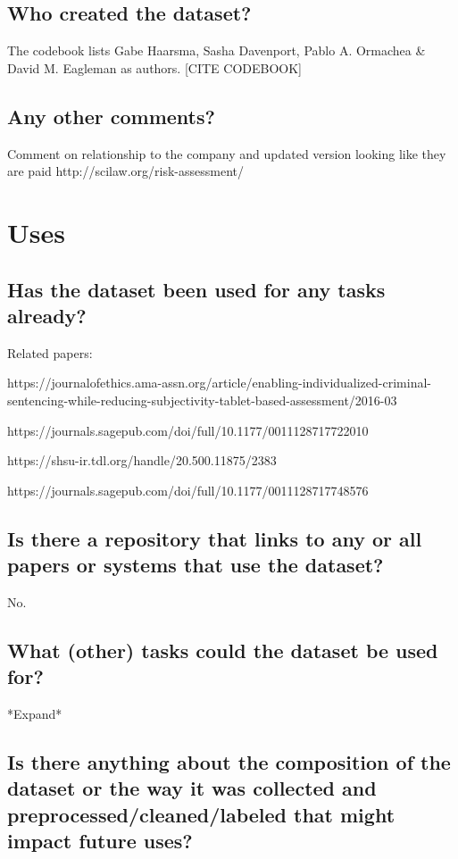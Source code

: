 \documentclass[letterpaper, 10 pt, conference]{ieeeconf}  %
\begin{document}
\subsection{Who created the dataset?}

The codebook lists Gabe Haarsma, Sasha Davenport, Pablo A. Ormachea & David M. Eagleman as authors. [CITE CODEBOOK]

\subsection{Any other comments?}

Comment on relationship to the company and updated version looking like they are paid 
http://scilaw.org/risk-assessment/

\section{Uses}

\subsection{Has the dataset been used for any tasks already?}

Related papers: 

https://journalofethics.ama-assn.org/article/enabling-individualized-criminal-sentencing-while-reducing-subjectivity-tablet-based-assessment/2016-03

https://journals.sagepub.com/doi/full/10.1177/0011128717722010

https://shsu-ir.tdl.org/handle/20.500.11875/2383

https://journals.sagepub.com/doi/full/10.1177/0011128717748576


\subsection{Is there a repository that links to any or all papers or systems that use the dataset?}

No.

\subsection{What (other) tasks could the dataset be used for?}

*Expand* 

\subsection{Is there anything about the composition of the dataset or the way it was collected and preprocessed/cleaned/labeled that might impact future uses?}
\end{document}
